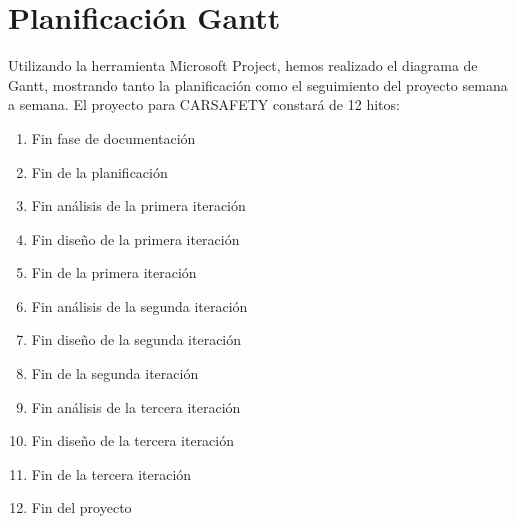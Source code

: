 \section{Planificación Gantt}

\par Utilizando la herramienta Microsoft Project, hemos realizado el diagrama de Gantt, mostrando tanto la planificación como el seguimiento del proyecto semana a semana. El proyecto para CARSAFETY constará de 12 hitos:

\begin{enumerate}
  \item Fin fase de documentación
  \item Fin de la planificación
  \item Fin análisis de la primera iteración
  \item Fin diseño de la primera iteración
  \item Fin de la primera iteración
  \item Fin análisis de la segunda iteración
  \item Fin diseño de la segunda iteración
  \item Fin de la segunda iteración
  \item Fin análisis de la tercera iteración
  \item Fin diseño de la tercera iteración
  \item Fin de la tercera iteración
  \item Fin del proyecto
\end{enumerate}
\clearpage

